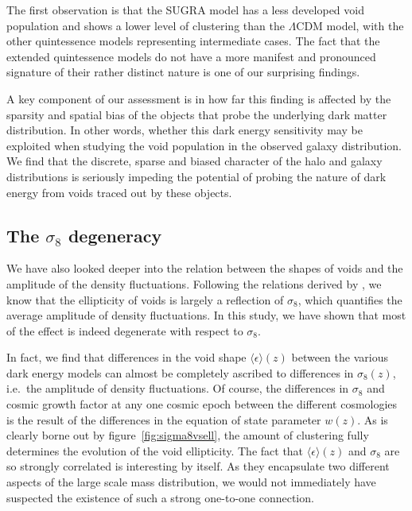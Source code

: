 The first observation is that the SUGRA model has a less developed void 
population and shows a lower level of clustering than the $\Lambda$CDM model, 
with the other quintessence models representing intermediate cases. The fact 
that the extended quintessence models do not have a more manifest and pronounced 
signature of their rather distinct nature is one of our surprising findings. 

A key component of our assessment is in how far this finding is affected by the 
sparsity and spatial bias of the objects that probe the underlying dark matter 
distribution. In other words, whether this dark energy sensitivity may be exploited 
when studying the void population in the observed galaxy distribution. We find that 
the discrete, sparse and biased character of the halo and galaxy distributions 
is seriously impeding the potential of probing the nature of dark energy from voids 
traced out by these objects. 

\subsection{The \texorpdfstring{$\sigma_8$}{sigma} degeneracy}
We have also looked deeper into the relation between the shapes of voids and the 
amplitude of the density fluctuations. Following the relations derived by 
\citet{parklee07}, we know that the ellipticity of voids is largely a reflection 
of $\sigma_8$, which quantifies the average amplitude of density fluctuations. 
In this study, we have shown that most of the effect is indeed degenerate with respect to 
$\sigma_8$. 

In fact, we find that differences in the void shape $\langle\epsilon\rangle(z)$ between the various dark energy models can almost be 
completely ascribed to differences in $\sigma_8(z)$, i.e.\ the amplitude of density fluctuations. Of course, the differences 
in $\sigma_8$ and cosmic growth factor at any one cosmic epoch between the different cosmologies is the result of the 
differences in the equation of state parameter $w(z)$. As is clearly borne out by figure~\ref{fig:sigma8vsell}, the amount 
of clustering fully determines the evolution of the void ellipticity. The fact that $\langle\epsilon\rangle(z)$ and $\sigma_8$ 
are so strongly correlated is interesting by itself. As they encapsulate two different aspects of the large scale mass 
distribution, we would not immediately have suspected the existence of such a strong one-to-one connection.

